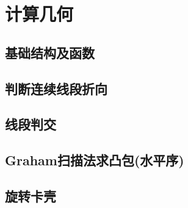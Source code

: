 \section{计算几何}
\subsection{基础结构及函数}


\subsection{判断连续线段折向}


\subsection{线段判交}


\subsection{Graham扫描法求凸包(水平序)}


\subsection{旋转卡壳}
